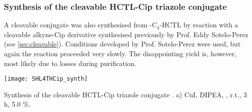 \subsubsection{Synthesis of the cleavable HCTL-Cip triazole conjugate }

A cleavable conjugate  was also synthesised from -C$_4$-HCTL  by reaction with a cleavable alkyne-Cip derivative  synthesised previously by Prof. Eddy Sotelo-Perez (see \ref{sec:cleavable}). Conditions developed by Prof. Sotelo-Perez were used, but again the reaction proceeded very slowly. The disappointing yield is, however, most likely due to losses during purification.

\begin{scheme}[H]
	\begin{center}
		\texttt{[image: SHL4THCip\_synth]}
		\caption{
			Synthesis of the cleavable HCTL-Cip triazole conjugate .
			a) CuI, DIPEA, , r.t., 3 h, 5.0 \%.
			\label{sch:SHL4THCip_synth}}
	\end{center}
\end{scheme}